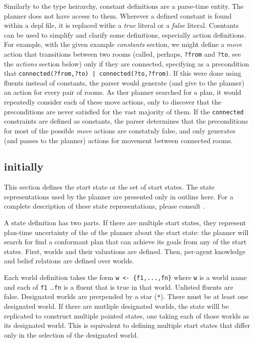 \documentclass{article}
\begin{document}
Similarly to the type heirarchy, constant definitions are a parse-time entity.
The planner does not have access to them.
Wherever a defined constant is found within a depl file, it is replaced withe a
\emph{true} literal or a
\emph{false} literal.  Cosntants can be used to simplify and clarify some definitions,
especially action definitions. For example, with the given example
\emph{constants} section, we might define a \emph{move} action that transitions
between two rooms (called, perhaps, \verb|?from| and \verb|?to|, see the
\emph{actions} section below) only if they are connected, specifying as a
precondition that \verb"connected(?from,?to) | connected(?to,?from)".  If this
were done using fluents instead of constants,
the parser would generate (and give to the planner) an
action for every pair of rooms. As ther planner searched for a plan, it
would repeatedly consider each of these move actions, only to discover that the
preconditions are never satisfied for the vast majority of them. If
the \verb|connected| constraints are defined as constants, the parser determines that
the preconditions for most of the possible \emph{move} actions are constatnly
false, and only generates (and passes to the planner) actions for movement
between connected rooms.



\subsection{initially}

This section defines the start state or the set of start states.
The state representations used by the planner are presented only in outline
here. For a complete description of these state representations, please
consult .

A state definition has two parts.
If there are multiple start states, they represent
plan-time uncertainty of the of the planner about the start state: the planner
will search for find a conformant plan that can achieve its goals from any of
the start states.
First, worlds and their valuations are
defined. Then, per-agent knowledge and belief relations are defined over worlds.

Each world definition takes the form
\verb|w <- {f1,...,fn}|
where \verb|w| is a world name
and each of \verb|f1| \ldots \verb|fn| is a fluent 
that is true in that world. Unlisted fluents are false.
Designated worlds are prerpended by a star (\verb|*|).
There must be at least one designated world. 
If there are mutliple designated worlds, the state willl be replicated to
construct multiple pointed states, one taking each of those worlds as its
designated world. This is equivalent to defining multiple start states that
differ only in the selection of the designated world.
\end{document}
